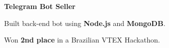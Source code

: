 \textbf{Telegram Bot Seller}

	\begin{items}
		\item Built back-end bot using \textbf{Node.js} and \textbf{MongoDB}.
		\item Won \textbf{2nd place} in a Brazilian VTEX Hackathon.
	\end{items}